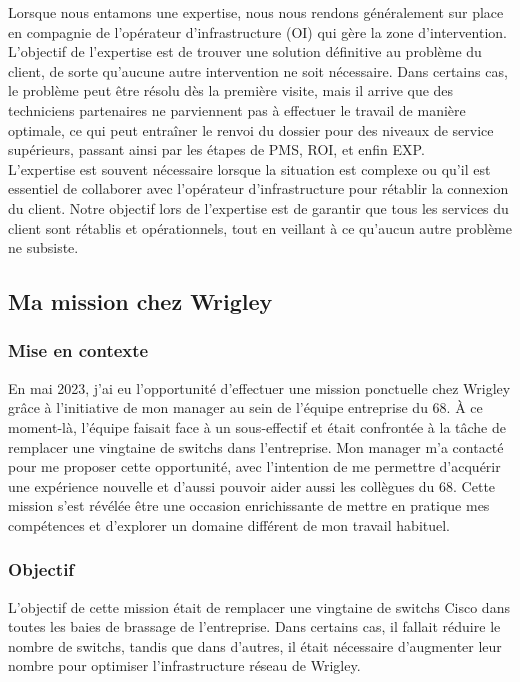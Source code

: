 \documentclass[12pt, a4paper]{article}
\begin{document}
Lorsque nous entamons une expertise, nous nous rendons généralement
sur place en compagnie de l'opérateur d'infrastructure (OI) qui gère
la zone d'intervention. L'objectif de l'expertise est de trouver
une solution définitive au problème du client, de sorte qu'aucune
autre intervention ne soit nécessaire. Dans certains cas, le problème
peut être résolu dès la première visite, mais il arrive que des
techniciens partenaires ne parviennent pas à effectuer le travail de
manière optimale, ce qui peut entraîner le renvoi du dossier pour
des niveaux de service supérieurs, passant ainsi par les étapes de
PMS, ROI, et enfin EXP.\\

L'expertise est souvent nécessaire lorsque la situation est complexe
ou qu'il est essentiel de collaborer avec l'opérateur
d'infrastructure pour rétablir la connexion du client. Notre objectif
lors de l'expertise est de garantir que tous les services du client
sont rétablis et opérationnels, tout en veillant à ce qu'aucun
autre problème ne subsiste. 

\newpage
\subsection{Ma mission chez Wrigley}
\subsubsection{Mise en contexte}
En mai 2023, j'ai eu l'opportunité d'effectuer une mission
ponctuelle chez Wrigley grâce à l'initiative de mon manager au
sein de l'équipe entreprise du 68. À ce moment-là, l'équipe faisait
face à un sous-effectif et était confrontée à la tâche de remplacer
une vingtaine de switchs dans l'entreprise. Mon manager m'a
contacté pour me proposer cette opportunité, avec l'intention de
me permettre d'acquérir une expérience nouvelle et d'aussi
pouvoir aider aussi les collègues du 68. Cette mission
s'est révélée être une occasion enrichissante de mettre en pratique
mes compétences et d'explorer un domaine différent de mon travail habituel.

\subsubsection{Objectif}
L'objectif de cette mission était
de remplacer une vingtaine de switchs
Cisco dans toutes les baies de brassage de l'entreprise.
Dans certains cas, il fallait
réduire le nombre de switchs, tandis que dans d'autres, il
était nécessaire d'augmenter leur nombre pour optimiser
l'infrastructure réseau de Wrigley.
\end{document}
